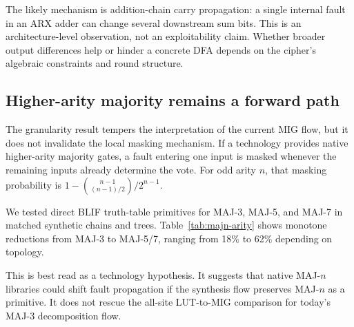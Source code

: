 The likely mechanism is addition-chain carry propagation: a single
internal fault in an ARX adder can change several downstream sum bits.
This is an architecture-level observation, not an exploitability claim.
Whether broader output differences help or hinder a concrete DFA depends
on the cipher's algebraic constraints and round structure.

\subsection{Higher-arity majority remains a forward path}
\label{sec:results:majn}

The granularity result tempers the interpretation of the current MIG
flow, but it does not invalidate the local masking mechanism. If a
technology provides native higher-arity majority gates, a fault entering
one input is masked whenever the remaining inputs already determine the
vote. For odd arity $n$, that masking probability is
$1-\binom{n-1}{(n-1)/2}/2^{n-1}$.

We tested direct BLIF truth-table primitives for MAJ-3, MAJ-5, and
MAJ-7 in matched synthetic chains and trees. Table~\ref{tab:majn-arity}
shows monotone \AvgDP{} reductions from MAJ-3 to MAJ-5/7, ranging from
18\% to 62\% depending on topology.



This is best read as a technology hypothesis. It suggests that native MAJ-$n$
libraries could shift fault propagation if the synthesis flow preserves
MAJ-$n$ as a primitive. It does not rescue the all-site LUT-to-MIG
comparison for today's MAJ-3 decomposition flow.
